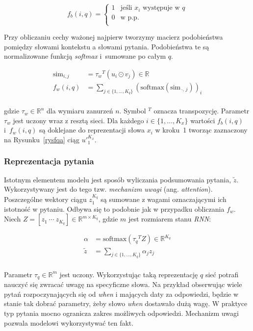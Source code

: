\[f_b(i, q) =
    \begin{cases}
        1 & \text{jeśli } x_i \text{ występuje w } q \\
        0 & \text{w p.p.} \\[5pt]
    \end{cases}
\]

Przy obliczaniu cechy ważonej najpierw tworzymy macierz podobieństwa pomiędzy słowami kontekstu a słowami pytania. Podobieństwa te są normalizowane funkcją \textit{softmax} i~sumowane po całym $q$.

\[
\begin{aligned}
    \mathrm{sim}_{i,j} &= {\tau_w}^T (u_i \odot v_j) \in \mathbb{R} \\[3pt]
    f_w(i, q) &= \sum\limits_{j \in \{1,\dots,K_q\}} (\mathrm{softmax}(\mathrm{sim}_{\,\cdot,\,j}))_i \\[5pt]
\end{aligned}
\]

\noindent
gdzie $\tau_w \in \mathbb{R}^n$ dla wymiaru zanurzeń $n$. Symbol $^T$ oznacza transpozycję. Parametr $\tau_w$ jest uczony wraz z resztą sieci. Dla każdego $i \in \{1,\dots,K_x\}$ wartości $f_b(i, q)$ i~$f_w(i,q)$ są doklejane do reprezentacji słowa $x_i$ w kroku~1 tworząc zaznaczony na Rysunku~\ref{rysfqa} ciąg ${u'}_1^{K_x}$.


\subsubsection{Reprezentacja pytania}

Istotnym elementem modelu jest sposób wyliczania podsumowania pytania, $\tilde{z}$. Wykorzystywany jest do tego tzw. \textit{mechanizm uwagi} (ang. \textit{attention}). Poszczególne wektory ciągu $z_1^{K_q}$ są sumowane z wagami oznaczającymi ich istotność w pytaniu. Odbywa się to podobnie jak w przypadku obliczania $f_w$. Niech $Z = [z_1\ \cdots\ z_{K_q}] \in \mathbb{R}^{m \times K_q}$, gdzie $m$ jest rozmiarem stanu \textit{RNN}:

\[
\begin{aligned}
    \alpha &= \mathrm{softmax}({\tau_q}^T Z) \in \mathbb{R}^{K_q} \\[3pt]
    \tilde{z} &= \sum\limits_{j \in \{1,\dots,K_q\}} \alpha_j z_j \\[5pt]
\end{aligned}
\]

Parametr $\tau_q \in \mathbb{R}^m$ jest uczony. Wykorzystując taką reprezentację $q$ sieć potrafi nauczyć się zwracać uwagę na specyficzne słowa. Na przykład obserwując wiele pytań rozpoczynających się od \textit{when} i mających daty za odpowiedzi, będzie w stanie tak dobrać parametry, żeby słowo \textit{when} dostawało dużą wagę. W praktyce typ pytania mocno ogranicza zakres możliwych odpowiedzi. Mechanizm uwagi pozwala modelowi wykorzystywać ten fakt.

